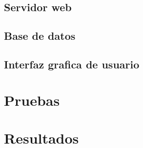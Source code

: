 
\subsection{Servidor web} %
\label{sub:servidor_web}



\subsection{Base de datos} %
\label{sub:base_de_datos}


\subsection{Interfaz grafica de usuario} %
\label{sub:interfaz_grafica_de_usuario}



\section{Pruebas} %
\label{sec:pruebas}


\section{Resultados} %
\label{sec:resultados}


